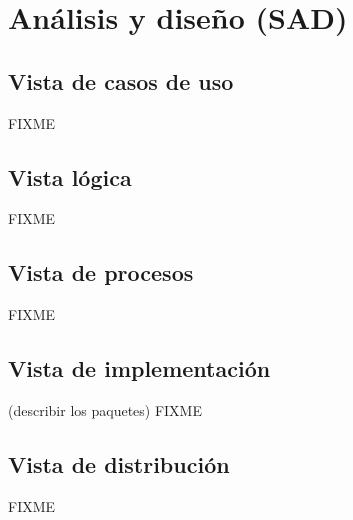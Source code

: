 
\section{Análisis y diseño (SAD)}

\subsection{Vista de casos de uso}

FIXME

\subsection{Vista lógica}

FIXME

\subsection{Vista de procesos}

FIXME

\subsection{Vista de implementación}

(describir los paquetes) FIXME

\subsection{Vista de distribución}

FIXME

